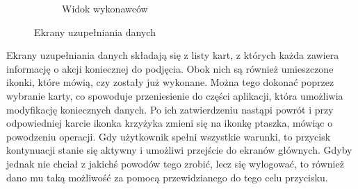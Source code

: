 \begin{figure}[ht]
\begin{subfigure}[t]{0.33\textwidth}
    \caption{Widok wykonawców}
  \end{subfigure}
  \caption{Ekrany uzupełniania danych}
  \label{fig:setup}
\end{figure}

Ekrany uzupełniania danych składają się z listy kart, z których każda zawiera informację o akcji koniecznej do podjęcia. Obok nich są również umieszczone ikonki, które mówią, czy zostały już wykonane. Można tego dokonać poprzez wybranie karty, co spowoduje przeniesienie do części aplikacji, która umożliwia modyfikację koniecznych danych. Po ich zatwierdzeniu nastąpi powrót i przy odpowiedniej karcie ikonka krzyżyka zmieni się na ikonkę ptaszka, mówiąc o powodzeniu operacji. Gdy użytkownik spełni wszystkie warunki, to przycisk kontynuacji stanie się aktywny i umożliwi przejście do ekranów głównych. Gdyby jednak nie chciał z jakichś powodów tego zrobić, lecz się wylogować, to również dano mu taką możliwość za pomocą przewidzianego do tego celu przycisku. 